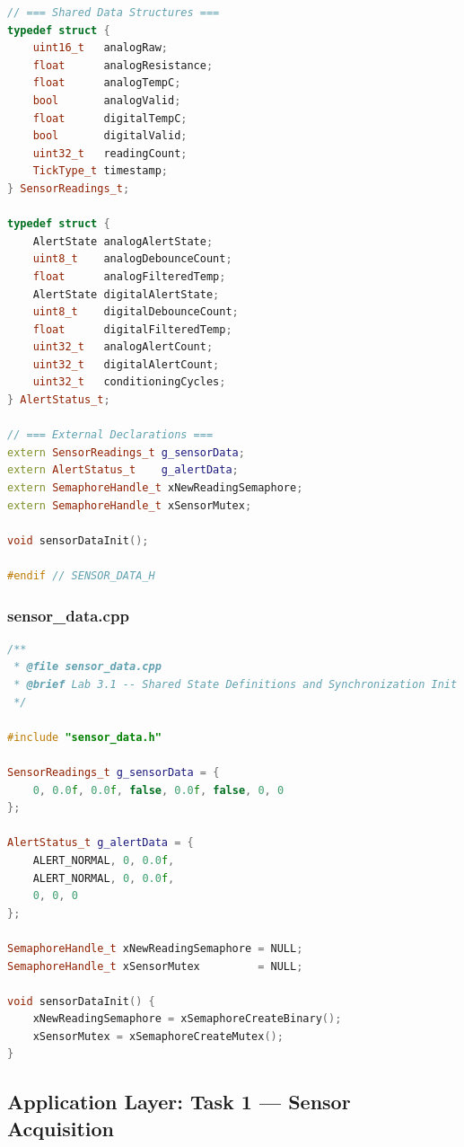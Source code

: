 \begin{lstlisting}[language=C++, caption=sensor\_data.h --- Shared Data Structures and Pin Mapping]
// === Shared Data Structures ===
typedef struct {
    uint16_t   analogRaw;
    float      analogResistance;
    float      analogTempC;
    bool       analogValid;
    float      digitalTempC;
    bool       digitalValid;
    uint32_t   readingCount;
    TickType_t timestamp;
} SensorReadings_t;

typedef struct {
    AlertState analogAlertState;
    uint8_t    analogDebounceCount;
    float      analogFilteredTemp;
    AlertState digitalAlertState;
    uint8_t    digitalDebounceCount;
    float      digitalFilteredTemp;
    uint32_t   analogAlertCount;
    uint32_t   digitalAlertCount;
    uint32_t   conditioningCycles;
} AlertStatus_t;

// === External Declarations ===
extern SensorReadings_t g_sensorData;
extern AlertStatus_t    g_alertData;
extern SemaphoreHandle_t xNewReadingSemaphore;
extern SemaphoreHandle_t xSensorMutex;

void sensorDataInit();

#endif // SENSOR_DATA_H
\end{lstlisting}

\subsubsection{sensor\_data.cpp}
\begin{lstlisting}[language=C++, caption=sensor\_data.cpp --- Shared State Definitions]
/**
 * @file sensor_data.cpp
 * @brief Lab 3.1 -- Shared State Definitions and Synchronization Init
 */

#include "sensor_data.h"

SensorReadings_t g_sensorData = {
    0, 0.0f, 0.0f, false, 0.0f, false, 0, 0
};

AlertStatus_t g_alertData = {
    ALERT_NORMAL, 0, 0.0f,
    ALERT_NORMAL, 0, 0.0f,
    0, 0, 0
};

SemaphoreHandle_t xNewReadingSemaphore = NULL;
SemaphoreHandle_t xSensorMutex         = NULL;

void sensorDataInit() {
    xNewReadingSemaphore = xSemaphoreCreateBinary();
    xSensorMutex = xSemaphoreCreateMutex();
}
\end{lstlisting}


\subsection{Application Layer: Task 1 --- Sensor Acquisition}

